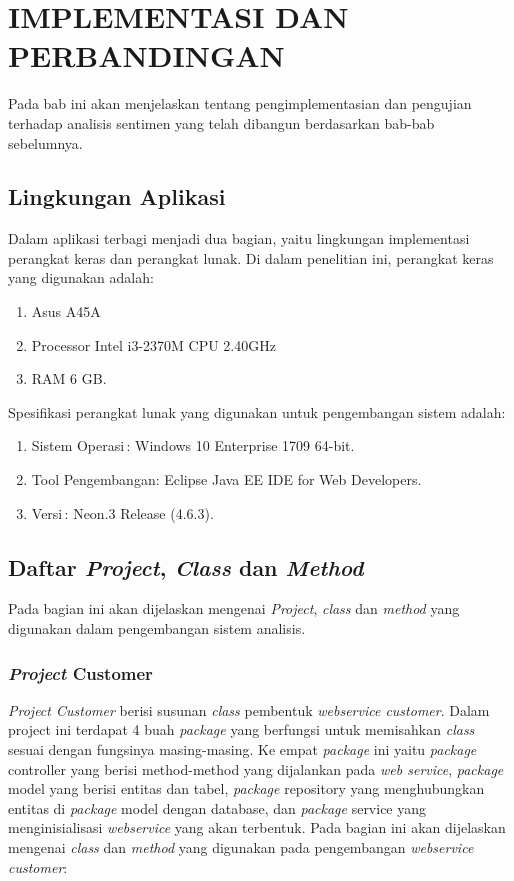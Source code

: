 \chapter{IMPLEMENTASI DAN PERBANDINGAN}

%
\vspace{4.5pt}
Pada bab ini akan menjelaskan tentang pengimplementasian dan pengujian terhadap analisis sentimen yang telah dibangun berdasarkan bab-bab sebelumnya.
\section{Lingkungan Aplikasi}
Dalam aplikasi terbagi menjadi dua bagian, yaitu lingkungan implementasi perangkat keras dan perangkat lunak. Di dalam penelitian ini, perangkat keras yang digunakan adalah:
\begin{enumerate}[leftmargin=*]
	\item Asus A45A
	\item Processor Intel i3-2370M CPU 2.40GHz
	\item RAM 6 GB.
\end{enumerate}

Spesifikasi perangkat lunak yang digunakan untuk pengembangan sistem adalah:
\begin{enumerate}[leftmargin=*]
	\item Sistem Operasi\quad\quad\quad\,: Windows 10 Enterprise 1709 64-bit.
	\item Tool Pengembangan\quad: Eclipse Java EE IDE for Web Developers.
	\item Versi\quad\quad\quad\quad\quad\quad\quad\,: Neon.3 Release (4.6.3).
\end{enumerate}

\section{Daftar \textit{Project}, \textit{Class} dan \textit{Method}}
Pada bagian ini akan dijelaskan mengenai \textit{Project}, \textit{class} dan \textit{method} yang digunakan dalam pengembangan sistem analisis.
\subsection{\textit{Project} Customer}
\textit{Project Customer} berisi susunan \textit{class} pembentuk \textit{webservice customer}. Dalam project ini terdapat 4 buah \textit{package} yang berfungsi untuk memisahkan \textit{class} sesuai dengan fungsinya masing-masing. Ke empat \textit{package} ini yaitu \textit{package} controller yang berisi method-method yang dijalankan pada \textit{web service}, \textit{package} model yang berisi entitas dan tabel, \textit{package} repository yang menghubungkan entitas di \textit{package} model dengan database, dan \textit{package} service yang menginisialisasi \textit{webservice} yang akan terbentuk. Pada bagian ini akan dijelaskan mengenai \textit{class} dan \textit{method} yang digunakan pada pengembangan \textit{ webservice customer}:
